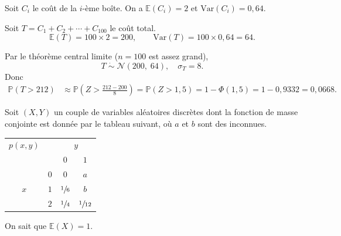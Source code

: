 \begin{questions}
\begin{parts}
    \begin{solution}
    Soit $C_i$ le coût de la $i$-ème boîte. On a $\mathbb{E}(C_i)=2$ et $\text{Var}(C_i)=0{,}64$.

    Soit $T = C_1 + C_2 + \cdots + C_{100}$ le coût total.
    \[
    \mathbb{E}(T) = 100 \times 2 = 200, \qquad
    \text{Var}(T) = 100 \times 0{,}64 = 64.
    \]

    Par le théorème central limite ($n=100$ est assez grand),
    \[
    T \;\dot\sim\; \mathcal{N}(200,\;64), \quad \sigma_T = 8.
    \]
    Donc
    \begin{align*}
    \mathbb{P}(T > 212)
    &\approx \mathbb{P}\!\left(Z > \frac{212 - 200}{8}\right)
    = \mathbb{P}(Z > 1{,}5)
    = 1 - \Phi(1{,}5)
    = 1 - 0{,}9332
    = 0{,}0668.
    \end{align*}
    \end{solution}
\end{parts}



\newpage

\question[] Soit $(X, Y)$ un couple de variables aléatoires discrètes dont la fonction de masse conjointe est donnée par le tableau suivant, où $a$ et $b$ sont des inconnues.

\begin{center}
\begin{tabular}{cc|cc}
$p(x,y)$ & & \multicolumn{2}{c}{$y$} \\
 & & $0$ & $1$  \\
\hline
 & $0$ & $0$ & $a$  \\
$x$ & $1$ & $\sfrac{1}{6}$ & $b$  \\
 & $2$ & $\sfrac{1}{4}$ & $\sfrac{1}{12}$  \\
\end{tabular}
\end{center}

On sait que $\mathbb{E}(X)=1$.

\end{questions}
